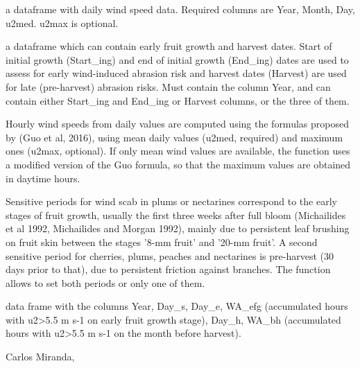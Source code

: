 \documentclass[a4paper]{book}
\begin{document}
%
\begin{Arguments}
\begin{ldescription}
\item[\code{climdata}] a dataframe with daily wind speed data.
Required columns are Year, Month, Day, u2med. u2max is
optional.

\item[\code{fendata}] a dataframe which can contain early fruit growth and
harvest dates. Start of initial growth (Start\_ing) and end of initial growth
(End\_ing) dates are used to assess for early wind-induced abrasion risk and
harvest dates (Harvest) are used for late (pre-harvest) abrasion risks.
Must contain the column Year, and can contain either Start\_ing and End\_ing
or Harvest columns, or the three of them.
\end{ldescription}
\end{Arguments}
%
\begin{Details}\relax
Hourly wind speeds from daily values are computed using the 
formulas proposed by (Guo et al, 2016), using mean daily 
values (u2med, required) and maximum ones (u2max, optional). 
If only mean wind values are available, the function uses a
modified version of the Guo formula, so that the maximum 
values are obtained in daytime hours.

Sensitive periods for wind scab in plums or nectarines
correspond to the early stages of fruit growth, usually the
first three weeks after full bloom (Michailides et al 1992, 
Michailides and Morgan 1992), mainly due to persistent leaf
brushing on fruit skin between the stages '8-mm fruit' and 
'20-mm fruit'. A second sensitive period for cherries, plums, 
peaches and nectarines is pre-harvest (30 days prior to that), 
due to persistent friction against branches. The function 
allows to set both periods or only one of them.
\end{Details}
%
\begin{Value}
data frame with the columns Year, Day\_s, Day\_e, WA\_efg (accumulated
hours with u2>5.5 m s-1 on early fruit growth stage), Day\_h, WA\_bh
(accumulated hours with u2>5.5 m s-1 on the month before harvest).
\end{Value}
%
\begin{Author}\relax
Carlos Miranda, 
\end{Author}
%
\end{document}
